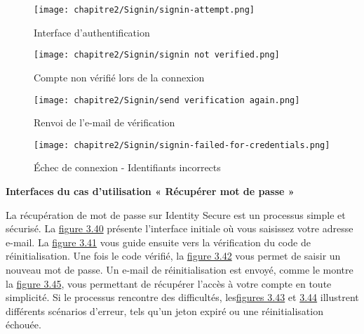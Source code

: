 \begin{figure}[h!]
  \centering

  \begin{minipage}[t]{0.45\textwidth}
    \vspace*{0pt} %
    \centering
    \texttt{[image: chapitre2/Signin/signin-attempt.png]}
    \caption{Interface d'authentification}
    \label{fig:3.36}
  \end{minipage}%
  \hfill
  \begin{minipage}[t]{0.45\textwidth}
    \vspace*{0pt} %
    \centering
    \texttt{[image: chapitre2/Signin/signin not verified.png]}
    \caption{Compte non vérifié lors de la connexion}
    \label{fig:3.37}
  \end{minipage}
\end{figure}
\FloatBarrier
\clearpage
\begin{figure}[h!]
  \centering

  \begin{minipage}[t]{0.45\textwidth}
    \vspace*{0pt} %
    \centering
    \texttt{[image: chapitre2/Signin/send verification again.png]}
    \caption{Renvoi de l'e-mail de vérification}
    \label{fig:3.38}
  \end{minipage}%
  \hfill
  \begin{minipage}[t]{0.45\textwidth}
    \vspace*{0pt} %
    \centering
    \texttt{[image: chapitre2/Signin/signin-failed-for-credentials.png]}

    \caption{Échec de connexion - Identifiants incorrects}
    \label{fig:3.39}
  \end{minipage}
\end{figure}
\textbf{Interfaces du cas d'utilisation « Récupérer mot de passe »}

La récupération de mot de passe sur Identity Secure est un processus simple et sécurisé. La \hyperref[fig:3.40]{figure 3.40} présente l'interface initiale où vous saisissez votre adresse e-mail. La \hyperref[fig:3.41]{figure 3.41} vous guide ensuite vers la vérification du code de réinitialisation. Une fois le code vérifié, la \hyperref[fig:3.42]{figure 3.42} vous permet de saisir un nouveau mot de passe.
Un e-mail de réinitialisation est envoyé, comme le montre la \hyperref[fig:3.45]{figure 3.45}, vous permettant de récupérer l'accès à votre compte en toute simplicité.
Si le processus rencontre des difficultés, les\hyperref[fig:3.43] {figures 3.43} et \hyperref[fig:3.44]{3.44} illustrent différents scénarios d'erreur, tels qu'un jeton expiré ou une réinitialisation échouée.

